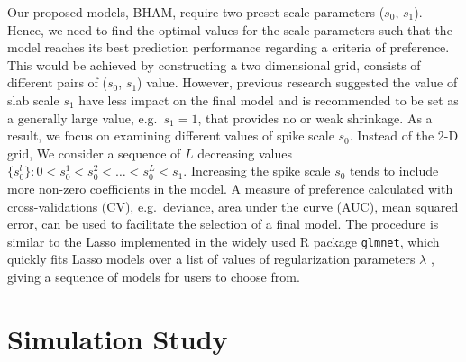 \documentclass[AMA,STIX1COL,]{WileyNJD-v2}
\begin{document}
Our proposed models, BHAM, require two preset scale parameters (\(s_0\),
\(s_1\)). Hence, we need to find the optimal values for the scale
parameters such that the model reaches its best prediction performance
regarding a criteria of preference. This would be achieved by
constructing a two dimensional grid, consists of different pairs of
(\(s_0\), \(s_1\)) value. However, previous research suggested the value
of slab scale \(s_1\) have less impact on the final model and is
recommended to be set as a generally large value, e.g.~\(s_1 = 1\), that
provides no or weak shrinkage. \citep{Rockova2018} As a result, we focus
on examining different values of spike scale \(s_0\). Instead of the 2-D
grid, We consider a sequence of \(L\) decreasing values
\(\{s_0^l\}: 0 < s_0^1 < s_0^2 < \dots < s_0^L < s_1\). Increasing the
spike scale \(s_0\) tends to include more non-zero coefficients in the
model. A measure of preference calculated with cross-validations (CV),
e.g.~deviance, area under the curve (AUC), mean squared error, can be
used to facilitate the selection of a final model. The procedure is
similar to the Lasso implemented in the widely used R package
\texttt{glmnet}, which quickly fits Lasso models over a list of values
of regularization parameters \(\lambda\) , giving a sequence of models
for users to choose from.

\section{Simulation Study}
\label{sec:sim}
\end{document}

